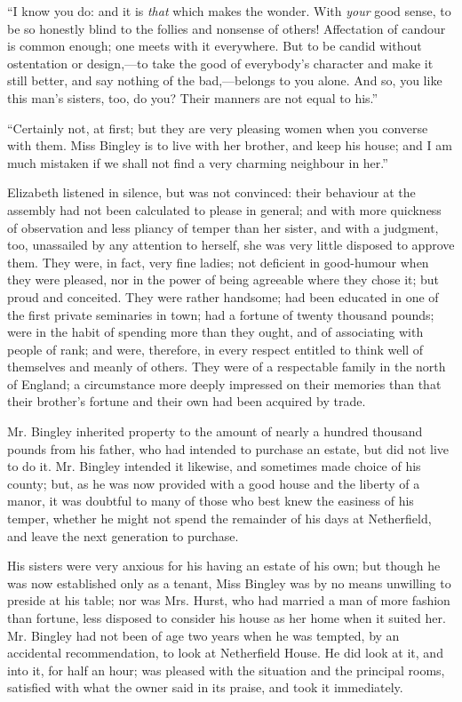 ``I know you do: and it is \textit{that} which makes the wonder. With \textit{your} good sense, to be so honestly blind to the follies and nonsense of others! Affectation of candour is common enough; one meets with it everywhere. But to be candid without ostentation or design,---to take the good of everybody's character and make it still better, and say nothing of the bad,---belongs to you alone. And so, you like this man's sisters, too, do you? Their manners are not equal to his.''

``Certainly not, at first; but they are very pleasing women when you converse with them. Miss Bingley is to live with her brother, and keep his house; and I am much mistaken if we shall not find a very charming neighbour in her.''

Elizabeth listened in silence, but was not convinced: their behaviour at the assembly had not been calculated to please in general; and with more quickness of observation and less pliancy of temper than her sister, and with a judgment, too, unassailed by any attention to herself, she was very little disposed to approve them. They were, in fact, very fine ladies; not deficient in good-humour when they were pleased, nor in the power of being agreeable where they chose it; but proud and conceited. They were rather handsome; had been educated in one of the first private seminaries in town; had a fortune of twenty thousand pounds; were in the habit of spending more than they ought, and of associating with people of rank; and were, therefore, in every respect entitled to think well of themselves and meanly of others. They were of a respectable family in the north of England; a circumstance more deeply impressed on their memories than that their brother's fortune and their own had been acquired by trade.

Mr. Bingley inherited property to the amount of nearly a hundred thousand pounds from his father, who had intended to purchase an estate, but did not live to do it. Mr. Bingley intended it likewise, and sometimes made choice of his county; but, as he was now provided with a good house and the liberty of a manor, it was doubtful to many of those who best knew the easiness of his temper, whether he might not spend the remainder of his days at Netherfield, and leave the next generation to purchase.

His sisters were very anxious for his having an estate of his own; but though he was now established only as a tenant, Miss Bingley was by no means unwilling to preside at his table; nor was Mrs. Hurst, who had married a man of more fashion than fortune, less disposed to consider his house as her home when it suited her. Mr. Bingley had not been of age two years when he was tempted, by an accidental recommendation, to look at Netherfield House. He did look at it, and into it, for half an hour; was pleased with the situation and the principal rooms, satisfied with what the owner said in its praise, and took it immediately.


